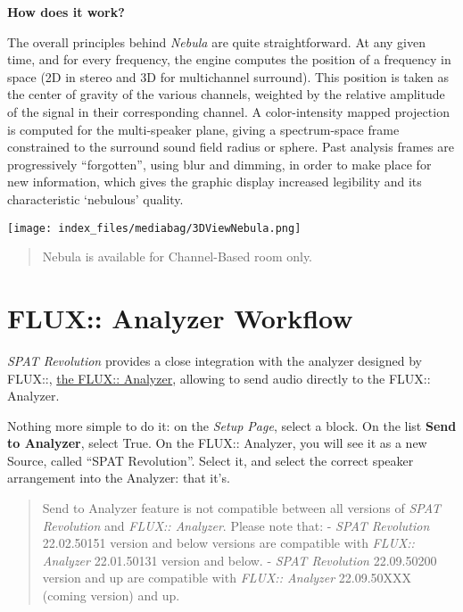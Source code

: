 \documentclass[
  letterpaper,
  DIV=11,
  numbers=noendperiod]{scrreport}
\begin{document}
\textbf{How does it work?}

The overall principles behind \emph{Nebula} are quite straightforward.
At any given time, and for every frequency, the engine computes the
position of a frequency in space (2D in stereo and 3D for multichannel
surround). This position is taken as the center of gravity of the
various channels, weighted by the relative amplitude of the signal in
their corresponding channel. A color-intensity mapped projection is
computed for the multi-speaker plane, giving a spectrum-space frame
constrained to the surround sound field radius or sphere. Past analysis
frames are progressively ``forgotten'', using blur and dimming, in order
to make place for new information, which gives the graphic display
increased legibility and its characteristic `nebulous' quality.

\texttt{[image: index\_files/mediabag/3DViewNebula.png]}

\begin{quote}
Nebula is available for Channel-Based room only.
\end{quote}

\hypertarget{flux-analyzer-workflow}{%
\chapter{FLUX:: Analyzer Workflow}\label{flux-analyzer-workflow}}

\emph{SPAT Revolution} provides a close integration with the analyzer
designed by FLUX::,
\href{https://www.flux.audio/project/flux-analyzer/}{the FLUX::
Analyzer}, allowing to send audio directly to the FLUX:: Analyzer.

Nothing more simple to do it: on the \emph{Setup Page}, select a block.
On the list \textbf{Send to Analyzer}, select True. On the FLUX::
Analyzer, you will see it as a new Source, called ``SPAT Revolution''.
Select it, and select the correct speaker arrangement into the Analyzer:
that it's.

\begin{quote}
Send to Analyzer feature is not compatible between all versions of
\emph{SPAT Revolution} and \emph{FLUX:: Analyzer}. Please note that: -
\emph{SPAT Revolution} 22.02.50151 version and below versions are
compatible with \emph{FLUX:: Analyzer} 22.01.50131 version and below. -
\emph{SPAT Revolution} 22.09.50200 version and up are compatible with
\emph{FLUX:: Analyzer} 22.09.50XXX (coming version) and up.
\end{quote}
\end{document}
